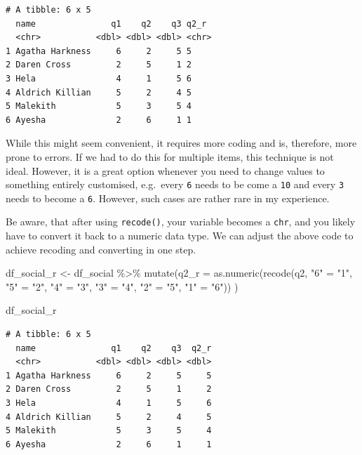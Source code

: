 \documentclass[
  letterpaper,
]{krantz}
\makeatletter
\newenvironment{Shaded}{\begin{snugshade}}{\end{snugshade}}
\newcommand{\AttributeTok}[1]{\textcolor[rgb]{0.40,0.45,0.13}{#1}}
\newcommand{\FunctionTok}[1]{\textcolor[rgb]{0.28,0.35,0.67}{#1}}
\newcommand{\NormalTok}[1]{\textcolor[rgb]{0.00,0.23,0.31}{#1}}
\newcommand{\OtherTok}[1]{\textcolor[rgb]{0.00,0.23,0.31}{#1}}
\newcommand{\SpecialCharTok}[1]{\textcolor[rgb]{0.37,0.37,0.37}{#1}}
\newcommand{\StringTok}[1]{\textcolor[rgb]{0.13,0.47,0.30}{#1}}
\newenvironment{kframe}{%
\medskip{}
\setlength{\fboxsep}{.8em}
 \def\at@end@of@kframe{}%
 \ifinner\ifhmode%
  \def\at@end@of@kframe{\end{minipage}}%
  \begin{minipage}{\columnwidth}%
 \fi\fi%
 \def\FrameCommand##1{\hskip\@totalleftmargin \hskip-\fboxsep
 \colorbox{shadecolor}{##1}\hskip-\fboxsep
     \hskip-\linewidth \hskip-\@totalleftmargin \hskip\columnwidth}%
 \MakeFramed {\advance\hsize-\width
   \@totalleftmargin\z@ \linewidth\hsize
   \@setminipage}}%
 {\par\unskip\endMakeFramed%
 \at@end@of@kframe}
\renewenvironment{Shaded}{\begin{kframe}}{\end{kframe}}
\makeatother
\begin{document}
\begin{verbatim}
# A tibble: 6 x 5
  name               q1    q2    q3 q2_r 
  <chr>           <dbl> <dbl> <dbl> <chr>
1 Agatha Harkness     6     2     5 5    
2 Daren Cross         2     5     1 2    
3 Hela                4     1     5 6    
4 Aldrich Killian     5     2     4 5    
5 Malekith            5     3     5 4    
6 Ayesha              2     6     1 1    
\end{verbatim}

While this might seem convenient, it requires more coding and is,
therefore, more prone to errors. If we had to do this for multiple
items, this technique is not ideal. However, it is a great option
whenever you need to change values to something entirely customised,
e.g.~every \texttt{6} needs to be come a \texttt{10} and every
\texttt{3} needs to become a \texttt{6}. However, such cases are rather
rare in my experience.

Be aware, that after using \texttt{recode()}, your variable becomes a
\texttt{chr}, and you likely have to convert it back to a numeric data
type. We can adjust the above code to achieve recoding and converting in
one step.

\begin{Shaded}
\begin{Highlighting}[]
\NormalTok{df\_social\_r }\OtherTok{\textless{}{-}}
\NormalTok{  df\_social }\SpecialCharTok{\%\textgreater{}\%}
  \FunctionTok{mutate}\NormalTok{(}\AttributeTok{q2\_r =} \FunctionTok{as.numeric}\NormalTok{(}\FunctionTok{recode}\NormalTok{(q2,}
                                  \StringTok{"6"} \OtherTok{=} \StringTok{"1"}\NormalTok{,}
                                  \StringTok{"5"} \OtherTok{=} \StringTok{"2"}\NormalTok{,}
                                  \StringTok{"4"} \OtherTok{=} \StringTok{"3"}\NormalTok{,}
                                  \StringTok{"3"} \OtherTok{=} \StringTok{"4"}\NormalTok{,}
                                  \StringTok{"2"} \OtherTok{=} \StringTok{"5"}\NormalTok{,}
                                  \StringTok{"1"} \OtherTok{=} \StringTok{"6"}\NormalTok{))}
\NormalTok{  )}

\NormalTok{df\_social\_r}
\end{Highlighting}
\end{Shaded}

\begin{verbatim}
# A tibble: 6 x 5
  name               q1    q2    q3  q2_r
  <chr>           <dbl> <dbl> <dbl> <dbl>
1 Agatha Harkness     6     2     5     5
2 Daren Cross         2     5     1     2
3 Hela                4     1     5     6
4 Aldrich Killian     5     2     4     5
5 Malekith            5     3     5     4
6 Ayesha              2     6     1     1
\end{verbatim}
\end{document}

